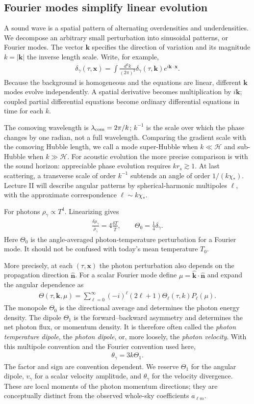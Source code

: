 \documentclass[12pt]{article}
\newcommand{\be}{\begin{eqnarray}}
\newcommand{\ee}{\end{eqnarray}}
\newcommand{\Hs}{\mathcal H}
\newcommand{\bk}{\mathbf k}
\newcommand{\bx}{\mathbf x}
\newcommand{\bn}{\hat{\mathbf n}}
\begin{document}
\subsection{Fourier modes simplify linear evolution}
A sound wave is a spatial pattern of alternating overdensities and underdensities.
We decompose an arbitrary small perturbation into sinusoidal patterns, or Fourier
modes. The vector $\bk$ specifies the direction of variation and its magnitude
$k=|\bk|$ the inverse length scale. Write, for example,
\be
\delta_\gamma(\tau,\bx)=\int\frac{d^3k}{(2\pi)^3}
\delta_\gamma(\tau,\bk)e^{i\bk\cdot\bx}.
\ee
Because the background is homogeneous and the equations are linear, different $\bk$
modes evolve independently. A spatial derivative becomes multiplication by $i\bk$;
coupled partial differential equations become ordinary differential equations in time
for each $k$.

The comoving wavelength is $\lambda_{\rm com}=2\pi/k$; $k^{-1}$ is the scale over
which the phase changes by one radian, not a full wavelength. Comparing the gradient
scale with the comoving Hubble length, we call a mode super-Hubble when $k\ll\Hs$
and sub-Hubble when $k\gg\Hs$. For acoustic evolution the more precise comparison
is with the sound horizon: appreciable phase evolution requires $kr_s\gtrsim1$.
At last scattering, a transverse scale of order $k^{-1}$ subtends an angle of order
$1/(k\chi_*)$. Lecture II will describe angular patterns by spherical-harmonic
multipoles $\ell$, with the approximate correspondence $\ell\sim k\chi_*$.

For photons $\rho_\gamma\propto T^4$. Linearizing gives
\be
\frac{\delta\rho_\gamma}{\bar\rho_\gamma}=4\frac{\delta T}{\bar T},
\qquad\boxed{\Theta_0=\frac14\delta_\gamma.}
\label{eq:ThetaMonopole}
\ee
Here $\Theta_0$ is the angle-averaged photon-temperature perturbation for a Fourier
mode. It should not be confused with today's mean temperature $T_0$.

More precisely, at each $(\tau,\bx)$ the photon perturbation also depends on the
propagation direction $\bn$. For a scalar Fourier mode define
$\mu=\hat{\bk}\cdot\bn$ and expand the angular dependence as
\be
\Theta(\tau,\bk,\mu)=\sum_{\ell=0}^{\infty}
(-i)^\ell(2\ell+1)\Theta_\ell(\tau,k)P_\ell(\mu).
\ee
The monopole $\Theta_0$ is the directional average and determines the photon energy
density. The dipole $\Theta_1$ is the forward--backward asymmetry and determines the
net photon flux, or momentum density. It is therefore often called the
\emph{photon temperature dipole}, the \emph{photon dipole}, or, more loosely, the
\emph{photon velocity}. With this multipole convention and the Fourier convention
used here,
\be
\boxed{\theta_\gamma=3k\Theta_1.}
\ee
The factor and sign are convention dependent. We reserve $\Theta_1$ for the angular
dipole, $v_\gamma$ for a scalar velocity amplitude, and $\theta_\gamma$ for the
velocity divergence. These are local moments of the photon momentum directions;
they are conceptually distinct from the observed whole-sky coefficients $a_{\ell m}$.
\end{document}
